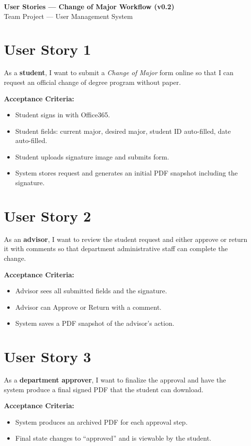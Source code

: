\documentclass[12pt]{article}
\begin{document}
\begin{center}
  \LARGE\textbf{User Stories — Change of Major Workflow (v0.2)}\\[8pt]
  \large Team Project — User Management System
\end{center}

\bigskip
\section*{User Story 1}
As a \textbf{student}, I want to submit a \emph{Change of Major} form online so that I can request an official change of degree program without paper.

\medskip
\textbf{Acceptance Criteria:}
\begin{itemize}
  \item Student signs in with Office365.
  \item Student fields: current major, desired major, student ID auto-filled, date auto-filled.
  \item Student uploads signature image and submits form.
  \item System stores request and generates an initial PDF snapshot including the signature.
\end{itemize}

\bigskip
\section*{User Story 2}
As an \textbf{advisor}, I want to review the student request and either approve or return it with comments so that department administrative staff can complete the change.

\medskip
\textbf{Acceptance Criteria:}
\begin{itemize}
  \item Advisor sees all submitted fields and the signature.
  \item Advisor can Approve or Return with a comment.
  \item System saves a PDF snapshot of the advisor’s action.
\end{itemize}

\bigskip
\section*{User Story 3}
As a \textbf{department approver}, I want to finalize the approval and have the system produce a final signed PDF that the student can download.

\medskip
\textbf{Acceptance Criteria:}
\begin{itemize}
  \item System produces an archived PDF for each approval step.
  \item Final state changes to ``approved'' and is viewable by the student.
\end{itemize}
\end{document}
